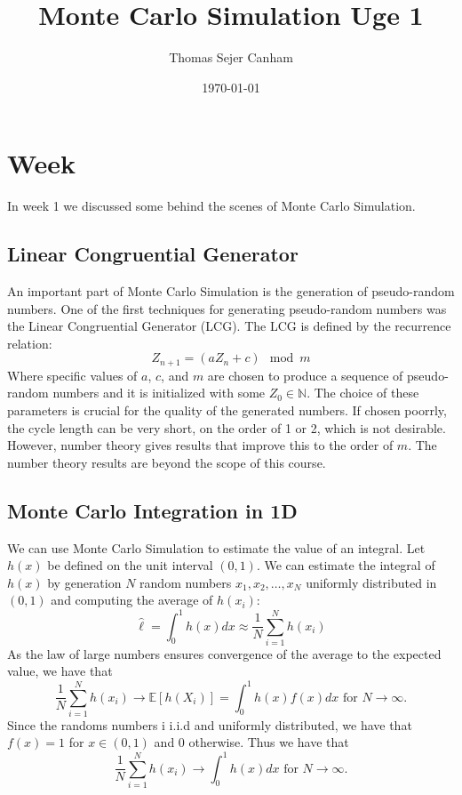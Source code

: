 \documentclass{article}
\title{Monte Carlo Simulation Uge 1}
\author{Thomas Sejer Canham}
\date{\today}
\theoremstyle{definition}
\theoremstyle{remark}
\begin{document}
\section{Week}

In week 1 we discussed some behind the scenes of Monte Carlo Simulation. 
\subsection{Linear Congruential Generator}

An important part of Monte Carlo Simulation is the generation of pseudo-random numbers. One of the first techniques for generating pseudo-random numbers was the Linear Congruential Generator (LCG). The LCG is defined by the recurrence relation:
\begin{equation}
    Z_{n+1} = (aZ_n + c) \mod m
\end{equation}
Where specific values of $a$, $c$, and $m$ are chosen to produce a sequence of pseudo-random numbers and it is initialized with some $Z_0 \in \mathbb{N}$. The choice of these parameters is crucial for the quality of the generated numbers. If chosen poorrly, the cycle length can be very short, on the order of 1 or 2, which is not desirable. However, number theory gives results that improve this to the order of $m$. The number theory results are beyond the scope of this course.

\subsection{Monte Carlo Integration in 1D}
We can use Monte Carlo Simulation to estimate the value of an integral. Let $h(x)$ be defined on the unit interval $(0,1)$. We can estimate the integral of $h(x)$ by generation $N$ random numbers $x_1, x_2, \ldots, x_N$ uniformly distributed in $(0,1)$ and computing the average of $h(x_i)$:
\begin{equation}
   \hat{\ell} = \int_0^1 h(x) dx \approx \frac{1}{N} \sum_{i=1}^{N} h(x_i)
\end{equation}
As the law of large numbers ensures convergence of the average to the expected value, we have that
\begin{equation}
    \dfrac{1}{N}\sum_{i=1}^{N} h(x_i) \to \mathbb{E}[h(X_i)] = \int_0^1 h(x)f(x) dx \text{ for } N \to \infty.
\end{equation}
Since the randoms numbers i i.i.d and uniformly distributed, we have that $f(x) = 1$ for $x \in (0,1)$ and $0$ otherwise. Thus we have that
\begin{equation}
    \dfrac{1}{N}\sum_{i=1}^{N} h(x_i) \to \int_0^1 h(x) dx \text{ for } N \to \infty.
\end{equation}
\end{document}
